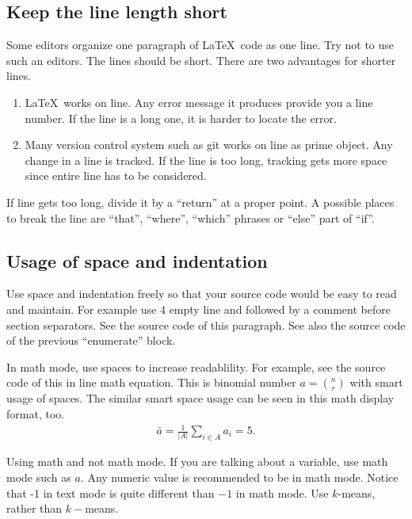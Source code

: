\documentclass[pre,twocolumn,showkeys,longbibliography]{revtex4-1}
\newcommand{\hbAbs}[1]{| #1 |}	%
\theoremstyle{plain}%
\theoremstyle{definition}
\theoremstyle{remark}
\begin{document}
\subsection{Keep the line length short}

Some editors organize one paragraph of \LaTeX\ code as one line.
Try not to use such an editors.
The lines should be short.
There are two advantages for shorter lines.
\begin{enumerate}

	\item
	\LaTeX\ works on line.
	Any error message it produces provide you a line number. 
	If the line is a long one,
	it is harder to locate the error.

	\item
	Many version control system such as git works on line as prime object.
	Any change in a line is tracked.
	If the line is too long,
	tracking gets more space since entire line has to be considered.

\end{enumerate}
If line gets too long,
divide it by a ``return'' at a proper point.
A possible places to break the line are ``that'', ``where'', ``which'' phrases or ``else'' part of ``if''. 




\subsection{Usage of space and indentation}

Use space and indentation freely so that your source code would be easy to read and maintain.
For example use 4 empty line and followed by a comment before section separators.
See the source code of this paragraph.
See also the source code of the previous ``enumerate'' block.

In math mode, 
use spaces to increase readablility.
For example, see the source code of this in line math equation.
This is binomial number
$
	a = {n \choose r}
$
with smart usage of spaces.
The similar smart space usage can be seen in this math display format, too.
\begin{align}
	\bar{a} 
		= 
			\frac{1}{\hbAbs{A}}
			\sum_{i \in A} a_{i}
		= 5.
\end{align}

Using math and not math mode.
If you are talking about a variable,
use math mode such as $a$.
Any numeric value is recommended to be in math mode.
Notice that -1 in text mode is quite different than $-1$ in math mode.
Use $k$-means, rather than $k-$means.
\end{document}
